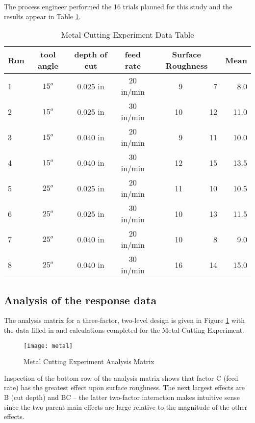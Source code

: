 The process engineer performed the 16 trials planned for this study and the results appear in Table \ref{tab6}.
\begin{table}[h]\caption{Metal Cutting Experiment Data Table}\label{tab6}
\begin{center}
\begin{tabular}{|l|c|c|c|r|r|r|}
\hline Run & \textbf{tool angle} & \textbf{depth of cut} & \textbf{feed rate} & \multicolumn{2}{c|}{\textbf{Surface Roughness}} & \textbf{Mean}\\ 
\hline 1 & $15^{o}$ & 0.025 in & 20 in/min &  9 &  7 &  8.0\\ 
\hline 2 & $15^{o}$ & 0.025 in & 30 in/min & 10 & 12 & 11.0\\ 
\hline 3 & $15^{o}$ & 0.040 in & 20 in/min &  9 & 11 & 10.0\\ 
\hline 4 & $15^{o}$ & 0.040 in & 30 in/min & 12 & 15 & 13.5\\
\hline 5 & $25^{o}$ & 0.025 in & 20 in/min & 11 & 10 & 10.5\\
\hline 6 & $25^{o}$ & 0.025 in & 30 in/min & 10 & 13 & 11.5\\
\hline 7 & $25^{o}$ & 0.040 in & 20 in/min & 10 &  8 &  9.0\\
\hline 8 & $25^{o}$ & 0.040 in & 30 in/min & 16 & 14 & 15.0\\ 
\hline 

\end{tabular} 
\end{center}
\end{table}
\subsection{Analysis of the response data}
The analysis matrix for a three-factor, two-level design is given in Figure \ref{fig5}  with the data filled in and calculations completed for the Metal Cutting Experiment.
\begin{figure}[h]\caption{Metal Cutting Experiment Analysis Matrix}\label{fig5}
\begin{center}
\texttt{[image: metal]}
\end{center}
\end{figure}
Inspection of the bottom row of the analysis matrix shows that factor C (feed rate) has the greatest effect upon surface roughness. The next largest effects are B (cut depth) and BC -- the latter two-factor interaction makes intuitive sense since the two parent main effects are large relative to the magnitude of the other effects.

